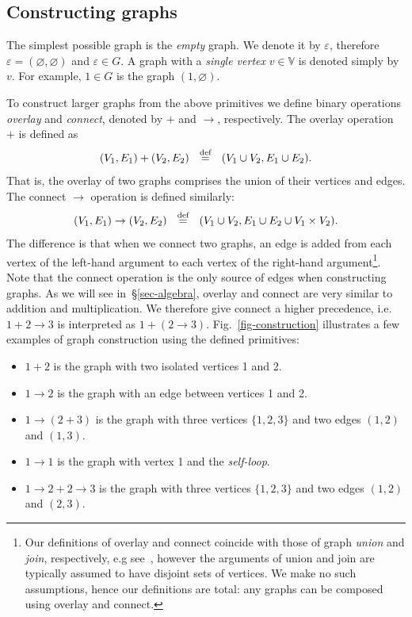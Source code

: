 \subsection{Constructing graphs}\label{sub-constructing}

The simplest possible graph is the \emph{empty} graph. We denote it by
$\varepsilon$, therefore $\varepsilon = (\varnothing, \varnothing)$ and
$\varepsilon \in G$. A graph with a \emph{single vertex} $v \in \mathbb{V}$
is denoted simply by $v$. For example, $1 \in G$ is the graph
$({1}, \varnothing)$.

To construct larger graphs from the above primitives we define binary
operations \emph{overlay} and \emph{connect}, denoted by $+$ and $\rightarrow$,
respectively. The overlay operation $+$ is defined as
\[
(V_1, E_1) + (V_2, E_2)~~\stackrel{\text{def}}{=}~~(V_1 \cup V_2, E_1 \cup E_2).
\]
That is, the overlay of two graphs comprises the union of their vertices and edges.
The connect $\rightarrow$ operation is defined similarly:
\[
(V_1, E_1) \rightarrow (V_2, E_2)~~\stackrel{\text{def}}{=}~~(V_1 \cup V_2, E_1 \cup E_2 \cup V_1 \times V_2).
\]
The difference is that when we connect two graphs, an edge is added from each
vertex of the left-hand argument to each vertex of the right-hand
argument\footnote{Our definitions of overlay and connect coincide
with those of graph \emph{union} and \emph{join}, respectively,
e.g see~\citet{1969_graph_theory_harary},
however the arguments of union and join are typically assumed to have disjoint
sets of vertices. We make no such assumptions, hence our definitions are total:
any graphs can be composed using overlay and connect.}.
Note that the connect operation is the only source of edges when constructing
graphs. As we will see in~\S\ref{sec-algebra}, overlay and connect
are very similar to addition and multiplication. We therefore give connect a higher
precedence, i.e. $1 + 2 \rightarrow 3$ is interpreted as $1 + (2 \rightarrow 3)$.
Fig.~\ref{fig-construction} illustrates a few examples of graph construction
using the defined primitives:
\begin{itemize}
  \item $1 + 2$ is the graph with two isolated vertices 1 and 2.
  \item $1 \rightarrow 2$ is the graph with an edge between vertices 1 and 2.
  \item $1 \rightarrow (2 + 3)$ is the graph with three vertices $\{1, 2, 3\}$
  and two edges $(1, 2)$ and $(1, 3)$.
  \item $1 \rightarrow 1$ is the graph with vertex 1 and the \emph{self-loop}.
  \item $1 \rightarrow 2 + 2 \rightarrow 3$ is the graph with three vertices $\{1, 2, 3\}$
  and two edges $(1, 2)$ and $(2, 3)$.
\end{itemize}

